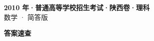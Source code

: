 \documentclass[zihao=-4, a4paper]{ctexart}
\begin{document}
\begin{center}
  {\Large\bfseries 2010 年·普通高等学校招生考试·陕西卷·理科}\\[4pt]
  {\large 数学 · 简答版}
\end{center}
\medskip
{}

\clearpage
{}
\begin{center}{\Large\bfseries 答案速查}\end{center}
\medskip

\end{document}

